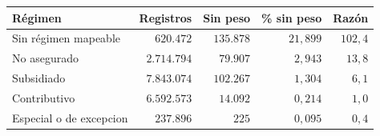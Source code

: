 \begin{tabular}{lrrrr}
\toprule
\textbf{Régimen} & \textbf{Registros} & \textbf{Sin peso} & \textbf{\% sin peso} & \textbf{Razón} \\
\midrule
Sin régimen mapeable & $620.472$ & $135.878$ & $21{,}899$ & $102{,}4$ \\
No asegurado & $2.714.794$ & $79.907$ & $2{,}943$ & $13{,}8$ \\
Subsidiado & $7.843.074$ & $102.267$ & $1{,}304$ & $6{,}1$ \\
Contributivo & $6.592.573$ & $14.092$ & $0{,}214$ & $1{,}0$ \\
Especial o de excepcion & $237.896$ & $225$ & $0{,}095$ & $0{,}4$ \\
\bottomrule
\end{tabular}